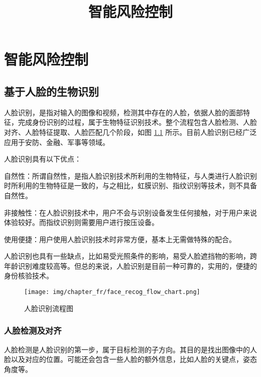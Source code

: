 \documentclass[graybox,envcountchap,sectrefs]{svmono}
\begin{document}
\title{智能风险控制}
\maketitle


\frontmatter%

%
%
%
%

\tableofcontents

%

\mainmatter%

\chapter{智能风险控制}
\label{basic} %


\section{基于人脸的生物识别}

人脸识别，是指对输入的图像和视频，检测其中存在的人脸，依据人脸的面部特征，完成身份识别的过程，属于生物特征识别技术。整个流程包含人脸检测、人脸对齐、人脸特征提取、人脸匹配几个阶段，如图 \ref{fig:face_recog_flow_chart} 所示。目前人脸识别已经广泛应用于安防、金融、军事等领域。

人脸识别具有以下优点：

自然性：所谓自然性，是指人脸识别技术所利用的生物特征，与人类进行人脸识别时所利用的生物特征是一致的，与之相比，虹膜识别、指纹识别等技术，则不具备自然性。

非接触性：在人脸识别技术中，用户不会与识别设备发生任何接触，对于用户来说体验较好。而指纹识别则需要用户进行按压设备。

使用便捷：用户使用人脸识别技术时非常方便，基本上无需做特殊的配合。

人脸识别也具有一些缺点，比如易受光照条件的影响，易受人脸遮挡物的影响，跨年龄识别难度较高等。但总的来说，人脸识别是目前一种可靠的，实用的，便捷的身份核验技术。

\begin{figure}[ht]
\centering
\texttt{[image: img/chapter\_fr/face\_recog\_flow\_chart.png]}
\caption{人脸识别流程图}
\label{fig:face_recog_flow_chart}
\end{figure}

\subsection{人脸检测及对齐}
人脸检测是人脸识别的第一步，属于目标检测的子方向。其目的是找出图像中的人脸以及对应的位置。可能还会包含一些人脸的额外信息，比如人脸的关键点，姿态角度等。
\end{document}

